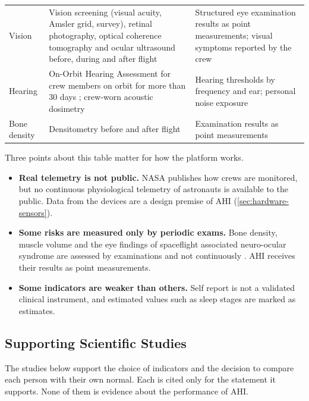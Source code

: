 \begin{table}[htbp]
\begin{tabular}{p{2.6cm}p{6.4cm}p{5.2cm}}
Vision & Vision screening (visual acuity, Amsler grid, survey), retinal photography, optical coherence tomography and ocular ultrasound before, during and after flight \cite{brunstetter2023brief} & Structured eye examination results as point measurements; visual symptoms reported by the crew \\
Hearing & On-Orbit Hearing Assessment for crew members on orbit for more than 30 days \cite{coste2024hearing}; crew-worn acoustic dosimetry \cite{limardo2021noise} & Hearing thresholds by frequency and ear; personal noise exposure \\
Bone density & Densitometry before and after flight \cite{lang2004bone} & Examination results as point measurements \\
\hline
\end{tabular}
\vspace{1.2em}
\end{table}

Three points about this table matter for how the platform works.

\begin{itemize}
\item \textbf{Real telemetry is not public.} NASA publishes how crews are monitored, but no continuous physiological telemetry of astronauts is available to the public. Data from the devices are a design premise of AHI (\ref{sec:hardware-sensors}).
\item \textbf{Some risks are measured only by periodic exams.} Bone density, muscle volume and the eye findings of spaceflight associated neuro-ocular syndrome are assessed by examinations and not continuously \cite{lang2004bone,nasa_hrr_sans}. AHI receives their results as point measurements.
\item \textbf{Some indicators are weaker than others.} Self report is not a validated clinical instrument, and estimated values such as sleep stages are marked as estimates.
\end{itemize}

\subsection{Supporting Scientific Studies}
\label{subsec:supporting-studies}

The studies below support the choice of indicators and the decision to compare each person with their own normal. Each is cited only for the statement it supports. None of them is evidence about the performance of AHI.

